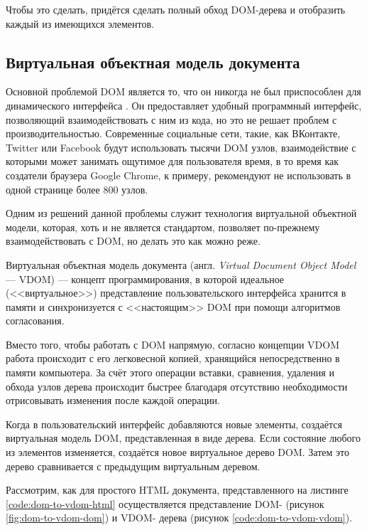 Чтобы это сделать, придётся сделать полный обход DOM-дерева и отобразить каждый из имеющихся элементов.

\clearpage

\subsection{Виртуальная объектная модель документа}

Основной проблемой DOM является то, что он никогда не был приспособлен для динамического интерфейса \cite{not-dynamic}. 
Он предоставляет удобный программный интерфейс, позволяющий взаимодействовать с ним из кода, но это не решает проблем с производительностью.
Современные социальные сети, такие, как ВКонтакте, Twitter или Facebook будут использовать тысячи DOM узлов, взаимодействие с которыми может занимать ощутимое для пользователя время, в то время как создатели браузера Google Chrome, к примеру, рекомендуют \cite{dom-max} не использовать в одной странице более 800 узлов.

Одним из решений данной проблемы служит технология виртуальной объектной модели, которая, хоть  и не является стандартом, позволяет по-прежнему взаимодействовать с DOM, но делать это как можно реже.

Виртуальная объектная модель документа (англ. \textit{Virtual Document Object Model} --- VDOM) \cite{vdom} ---  концепт программирования, в которой идеальное (<<виртуальное>>) представление пользовательского интерфейса хранится в памяти и синхронизуется с <<настоящим>> DOM при помощи алгоритмов согласования.

Вместо того, чтобы работать с DOM напрямую, согласно концепции VDOM работа происходит с его легковесной копией, хранящийся непосредственно в памяти компьютера. 
За счёт этого операции вставки, сравнения, удаления и обхода узлов дерева происходит быстрее благодаря отсутствию необходимости отрисовывать изменения после каждой операции.

Когда в пользовательский интерфейс добавляются новые элементы, создаётся виртуальная модель DOM, представленная в виде дерева. 
Если состояние любого из элементов изменяется, создаётся новое виртуальное дерево DOM. 
Затем это дерево сравнивается с предыдущим виртуальным деревом.


Рассмотрим, как для простого  HTML документа, представленного на листинге \ref{code:dom-to-vdom-html} осуществляется представление DOM- (рисунок \ref{fig:dom-to-vdom-dom}) и VDOM- дерева (рисунок \ref{code:dom-to-vdom-vdom}).
\clearpage
{}
 
